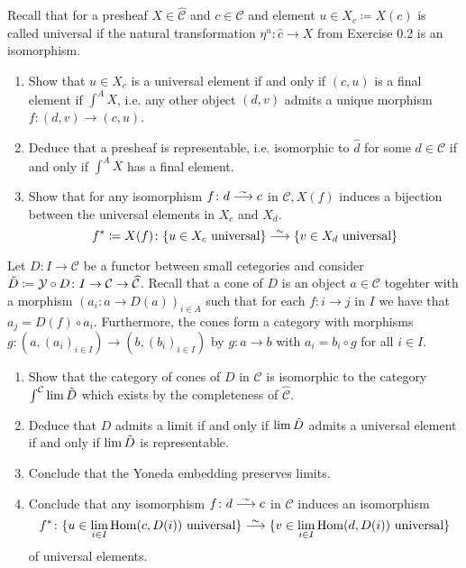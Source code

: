 \begin{Exercise}
	Recall that for a presheaf $ X \in \widehat{ \mathcal{ C } } $ and $ c \in \mathcal{ C } $ and element $ u \in X_c \coloneqq X ( c ) $ is called universal if the natural transformation $ \eta^u \colon \widehat{ c } \to X $ from Exercise 0.2 is an isomorphism.
	\begin{enumerate}[label=(\alph*)]
		\item 
		Show that $ u \in X_c $ is a universal element if and only if $ ( c , u ) $ is a final element if $ \int^A X $, i.e. any other object $ ( d , v ) $ admits a unique morphism $ f \colon ( d , v ) \to  ( c , u ) $.
		
		\item 
		Deduce that a presheaf is representable, i.e. isomorphic to $ \widehat{ d } $ for some $ d \in \mathcal{ C } $ if and only if $ \int^A X $ has a final element.
		
		\item 
		Show that for any isomorphism $ f \colon d \isomorphism c $ in $ \mathcal{ C },   X ( f ) $ induces a bijection between the universal elements in $ X_c $ and $ X_d $.
		\[
		f^* \coloneqq X ( f ) \colon \{ u \in X_c \text{ universal} \}
		\isomorphism
		\{ v \in X_d \text{ universal} \}
		\]
	\end{enumerate}
\end{Exercise}

\begin{Exercise}
	Let $ D \colon I \to \mathcal{ C } $ be a functor between small cetegories and consider $ \Tilde{ D } \coloneqq \mathcal{ Y } \circ D \colon I \to \mathcal{ C } \to \widehat{ \mathcal{ C } } $.
	Recall that a cone of $ D $ is an object $ a \in \mathcal{ C } $ togehter with a morphism $ ( a_i \colon a \to D ( a ) )_{ i \in A } $ such that for each $ f \colon i \to j $ in $ I $ we have that $ a_j = D ( f ) \circ a_i.$ Furthermore, the cones form a category with morphisms $ g \colon ( a , ( a_i )_{ i \in I } ) \to ( b , ( b_i )_{ i \in I } ) $ by $ g \colon a \to b $ with $ a_i = b_i \circ g $ for all $ i \in I $.
	\begin{enumerate}
		\item 
		Show that the category of cones of $ D $ in $ \mathcal{ C } $ is isomorphic to the category $ \int^{ \mathcal{ C } } \lim \Tilde{ D } $ which exists by the completeness of $ \widehat{ \mathcal{ C }}$.
		
		\item 
		Deduce that $ D $ admits a limit if and only if $ \lim \Tilde{ D } $ admits a universal element if and only if $ \lim \Tilde{ D} $ is representable.
		
		\item 
		Conclude that the Yoneda embedding  preserves limits.
		
		\item 
		Conclude that any isomorphism $ f \colon d \isomorphism c $ in $ \mathcal{ C } $ induces an isomorphism
		\[
			f^* \colon \{ u \in \lim_{ i \in I } \Hom ( c , D ( i ) ) \text{ universal}\}
			\isomorphism 
			\{ v \in \lim_{ i \in I } \Hom ( d , D ( i ) ) \text{ universal}\}
		\]
		of universal elements.
	\end{enumerate} 
\end{Exercise}
